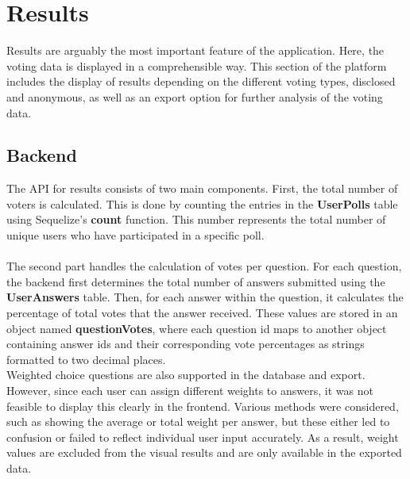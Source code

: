 \documentclass[a4paper,12pt]{report}
\begin{document}
\section{Results}
Results are arguably the most important feature of the application. Here, the voting data is displayed in a comprehensible way. This section of the platform includes the display of results depending on the different voting types, disclosed and anonymous, as well as an export option for further analysis of the voting data. 

\subsection{Backend}
The API for results consists of two main components. First, the total number of voters is calculated. This is done by counting the entries in the \textbf{UserPolls} table using Sequelize's \textbf{count} function. This number represents the total number of unique users who have participated in a specific poll. \\ \\
The second part handles the calculation of votes per question. For each question, the backend first determines the total number of answers submitted using the \textbf{UserAnswers} table. Then, for each answer within the question, it calculates the percentage of total votes that the answer received. These values are stored in an object named \textbf{questionVotes}, where each question id maps to another object containing answer ids and their corresponding vote percentages as strings formatted to two decimal places. \\
Weighted choice questions are also supported in the database and export. However, since each user can assign different weights to answers, it was not feasible to display this clearly in the frontend. Various methods were considered, such as showing the average or total weight per answer, but these either led to confusion or failed to reflect individual user input accurately. As a result, weight values are excluded from the visual results and are only available in the exported data.
\end{document}
